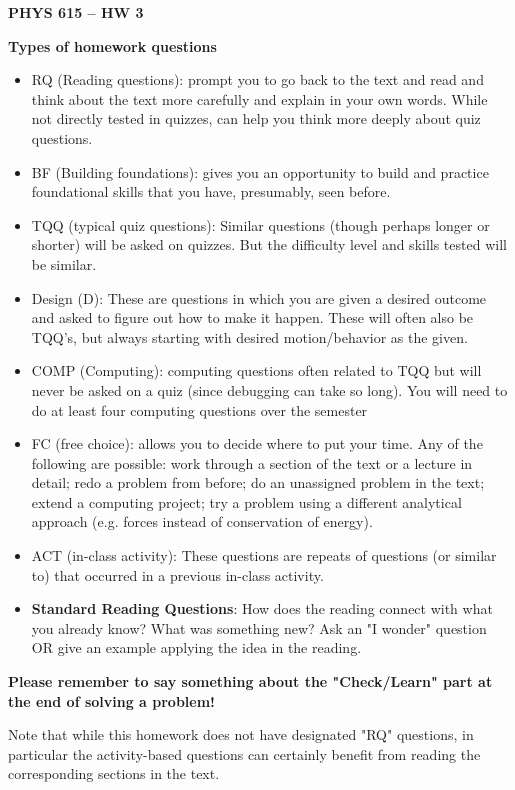 \documentclass[12pt]{article}
\newcommand{\shortlist}{%
\parindent 0in%
\parskip   0in%
\itemsep   0in%
\topsep    0in%
\parsep    0in%
}
\newcommand{\Title}{PHYS 615 -- HW 3}
\begin{document}
\begin{center}
{\Large\bfseries\Title}

\end{center}
\bigskip
\bigskip

\textbf{Types of homework questions}
\begin{itemize}\shortlist
\item	RQ (Reading questions):  prompt you to go back to the text and read and think about the text more carefully and explain in your own words. While not directly tested in quizzes, can help you think more deeply about quiz questions.
\item	BF (Building foundations):  gives you an opportunity to build and practice foundational skills that you have, presumably, seen before.
\item	TQQ (typical quiz questions):   Similar questions (though perhaps longer or shorter) will be asked on quizzes.  But the difficulty level and skills tested will be similar.
\item Design (D):  These are questions in which you are given a desired outcome and asked to figure out how to make it happen.  These will often also be TQQ’s, but always starting with desired motion/behavior as the given.
\item	COMP (Computing): computing questions often related to TQQ but will never be asked on a quiz (since debugging can take so long).  You will need to do at least four computing questions over the semester
\item	FC (free choice): allows you to decide where to put your time.  Any of the following are possible:  work through a section of the text or a lecture in detail; redo a problem from before; do an unassigned problem in the text; extend a computing project; try a problem using a different analytical approach (e.g. forces instead of conservation of energy).
\item ACT (in-class activity): These questions are repeats of questions (or similar to) that occurred in a previous in-class activity.
\item \textbf{Standard Reading Questions}: How does the reading connect with what you already know? What was something new?  Ask an "I wonder" question OR give an example applying the idea in the reading.
\end{itemize}

\textbf{Please remember to say something about the "Check/Learn" part at the end of solving a problem!}

Note that while this homework does not have designated "RQ" questions, in particular the activity-based questions can certainly benefit from reading the corresponding sections in the text.
\end{document}

